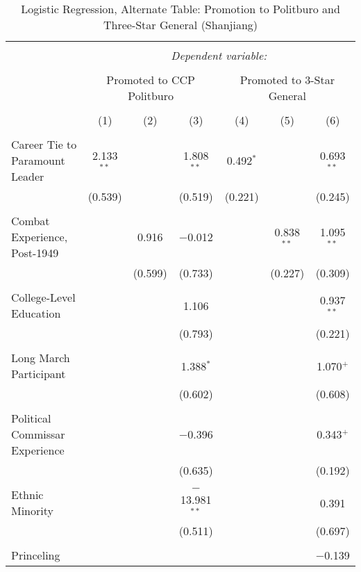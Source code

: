 
\begin{table}[!htbp] \centering 
  \caption{Logistic Regression, Alternate Table: Promotion to Politburo and Three-Star General (Shanjiang)} 
  \label{table_a10} 
\begin{tabular}{@{\extracolsep{5pt}}lcccccc} 
\\[-1.8ex]\hline 
\hline \\[-1.8ex] 
 & \multicolumn{6}{c}{\textit{Dependent variable:}} \\ 
\cline{2-7} 
\\[-1.8ex] & \multicolumn{3}{c}{Promoted to CCP Politburo} & \multicolumn{3}{c}{Promoted to 3-Star General} \\ 
\\[-1.8ex] & (1) & (2) & (3) & (4) & (5) & (6)\\ 
\hline \\[-1.8ex] 
 Career Tie to Paramount Leader & 2.133$^{**}$ &  & 1.808$^{**}$ & 0.492$^{*}$ &  & 0.693$^{**}$ \\ 
  & (0.539) &  & (0.519) & (0.221) &  & (0.245) \\ 
  & & & & & & \\ 
 Combat Experience, Post-1949 &  & 0.916 & $-$0.012 &  & 0.838$^{**}$ & 1.095$^{**}$ \\ 
  &  & (0.599) & (0.733) &  & (0.227) & (0.309) \\ 
  & & & & & & \\ 
 College-Level Education &  &  & 1.106 &  &  & 0.937$^{**}$ \\ 
  &  &  & (0.793) &  &  & (0.221) \\ 
  & & & & & & \\ 
 Long March Participant &  &  & 1.388$^{*}$ &  &  & 1.070$^{+}$ \\ 
  &  &  & (0.602) &  &  & (0.608) \\ 
  & & & & & & \\ 
 Political Commissar Experience &  &  & $-$0.396 &  &  & 0.343$^{+}$ \\ 
  &  &  & (0.635) &  &  & (0.192) \\ 
  & & & & & & \\ 
 Ethnic Minority &  &  & $-$13.981$^{**}$ &  &  & 0.391 \\ 
  &  &  & (0.511) &  &  & (0.697) \\ 
  & & & & & & \\ 
 Princeling &  &  &  &  &  & $-$0.139 \\ 

\end{tabular}
\end{table}
